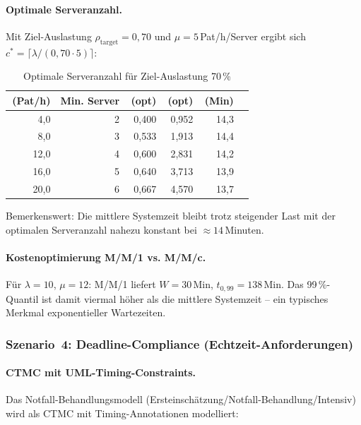 ﻿\documentclass[a4paper,12pt]{scrreprt}
\theoremstyle{definition}
\begin{document}
\paragraph{Optimale Serveranzahl.}
Mit Ziel-Auslastung $\rho_\text{target} = 0{,}70$ und $\mu = 5$\,Pat/h/Server
ergibt sich $c^* = \lceil \lambda / (0{,}70 \cdot 5) \rceil$:

\begin{table}[H]
	\centering
	\begin{tabular}{@{}rrrrrr@{}}
		\toprule
		\boldmath{$\lambda$}\,{\small(Pat/h)} & \textbf{Min. Server} & \boldmath{$\rho$}\,{\small(opt)} &
		\boldmath{$L$}\,{\small(opt)} & \boldmath{$W$}\,{\small(Min)} \\
		\midrule
		4{,}0 & 2 & 0{,}400 & 0{,}952 & 14{,}3 \\
		8{,}0 & 3 & 0{,}533 & 1{,}913 & 14{,}4 \\
		12{,}0 & 4 & 0{,}600 & 2{,}831 & 14{,}2 \\
		16{,}0 & 5 & 0{,}640 & 3{,}713 & 13{,}9 \\
		20{,}0 & 6 & 0{,}667 & 4{,}570 & 13{,}7 \\
		\bottomrule
	\end{tabular}
	\caption{Optimale Serveranzahl für Ziel-Auslastung 70\,\%}
	\label{tab:capacity-planning}
\end{table}

Bemerkenswert: Die mittlere Systemzeit bleibt trotz steigender Last mit der
optimalen Serveranzahl nahezu konstant bei $\approx 14$\,Minuten.

\paragraph{Kostenoptimierung M/M/1 vs. M/M/c.}
Für $\lambda = 10$, $\mu = 12$: M/M/1 liefert $W = 30$\,Min,
$t_{0{,}99} = 138$\,Min. Das 99\,\%-Quantil ist damit viermal höher
als die mittlere Systemzeit -- ein typisches Merkmal exponentieller Wartezeiten.

\subsubsection{Szenario~4: Deadline-Compliance (Echtzeit-Anforderungen)}

\paragraph{CTMC mit UML-Timing-Constraints.}
Das Notfall-Behandlungsmodell (Ersteinschät\-zung/Notfall-Behandlung/Intensiv)
wird als CTMC mit Timing-Annotationen modelliert:
\end{document}
